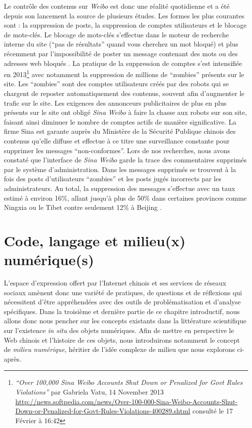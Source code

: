 Le contrôle des contenus sur \textit{Weibo} est donc une réalité quotidienne et a été depuis son lancement la source de plusieurs études. Les formes les plus courantes sont : la suppression de posts, la suppression de comptes utilisateurs et le blocage de mots-clés. Le blocage de mots-clés s’effectue dans le moteur de recherche interne du site (“pas de résultats” quand vous cherchez un mot bloqué) et plus récemment par l’impossibilité de poster un message contenant des mots ou des adresses web bloqués \citep{Ng2013}. La pratique de la suppression de comptes s’est intensifiée en 2013\footnote{ \textit{“Over 100,000 \textit{Sina Weibo} Accounts Shut Down or Penalized for Govt Rules Violations”} par Gabriela Vatu, 14 November 2013 \url{http://news.softpedia.com/news/Over-100-000-Sina-Weibo-Accounts-Shut-Down-or-Penalized-for-Govt-Rules-Violations-400289.shtml} consulté le 17 Février à 16:42} avec notamment la suppression de millions de “zombies” présents sur le site. Les “zombies” sont des comptes utilisateurs créés par des robots qui se chargent de reposter automatiquement des contenus, souvent afin d’augmenter le trafic sur le site. Les exigences des annonceurs publicitaires de plus en plus présents sur le site ont obligé \textit{Sina Weibo} à faire la chasse aux robots sur son site, faisant ainsi diminuer le nombre de comptes actifs de manière significative. La firme Sina est garante auprès du Ministère de la Sécurité Publique chinois des contenus qu’elle diffuse et effectue à ce titre une surveillance constante pour supprimer les messages “non-conformes”. Lors de nos recherches, nous avons constaté que l’interface de \textit{Sina Weibo} garde la trace des commentaires supprimés par le système d’administration. Dans les messages supprimés se trouvent à la fois des posts d’utilisateurs “zombies” et les posts jugés incorrects par les administrateurs. Au total, la suppression des messages s’effectue avec un taux estimé à environ 16\%, allant jusqu’à plus de 50\% dans certaines provinces comme Ningxia ou le Tibet contre seulement 12\% à Beijing \citep{Bamman2012}.


\section[Code, langage et milieu(x) numérique(s)]{ Code, langage et milieu(x) numérique(s)}

L’espace d’expression offert par l’Internet chinois et ses services de réseaux sociaux amènent donc une variété de pratiques, de questions et de réflexions qui nécessitent d’être appréhendées avec des outils de problématisation et d’analyse spécifiques. Dans la troisième et dernière partie de ce chapitre introductif, nous allons donc nous pencher sur les concepts existants dans la littérature scientifique sur l’existence \textit{in situ} des objets numériques. Afin de mettre en perspective le Web chinois et l’histoire de ces objets, nous introduirons notamment le concept de \textit{milieu numérique}, héritier de l’idée complexe de milieu que nous explorons ci-après.

